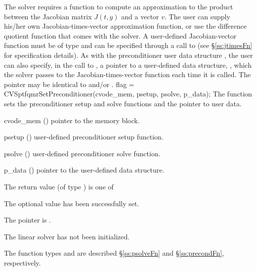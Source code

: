The 
{\cvsptfqmr} solver requires a function to compute an approximation to the
product between the Jacobian matrix $J(t,y)$ and a vector $v$.
The user can supply his/her own Jacobian-times-vector approximation function, 
or use the difference quotient function  
that comes with the {\cvsptfqmr} solver.   A user-defined Jacobian-vector
function must be of type  and 
can be specified through a call to  
(see \S\ref{ss:jtimesFn} for specification details).
As with the preconditioner user data structure , the user can
also specify, in the call to , a pointer to a 
user-defined data structure, , which the {\cvsptfqmr} solver
passes to the Jacobian-times-vector function  each time it is called.
The pointer  may be identical to  and/or .
{
  flag = CVSptfqmrSetPreconditioner(cvode\_mem, psetup, psolve, p\_data);
}
{
  The function  sets the preconditioner
  setup and solve functions and the pointer to user data.
}
{
  \begin{args}
  \item[cvode\_mem] ()
    pointer to the {\cvodes} memory block.
  \item[psetup] ()
    user-defined preconditioner setup function.
  \item[psolve] ()
    user-defined preconditioner solve function.
  \item[p\_data] ()
     pointer to the user-defined data structure.
  \end{args}
}
{
  The return value  (of type ) is one of
  \begin{args}
  \item[\Id{CVSPTFQMR\_SUCCESS}] 
    The optional value has been successfully set.
  \item[\Id{CVSPTFQMR\_MEM\_NULL}]
    The  pointer is .
  \item[\Id{CVSPTFQMR\_LMEM\_NULL}]
    The {\cvsptfqmr} linear solver has not been initialized.
  \end{args}
}
{
   The function types  and  are
   described \S\ref{ss:psolveFn} and \S\ref{ss:precondFn}, respectively.
}
